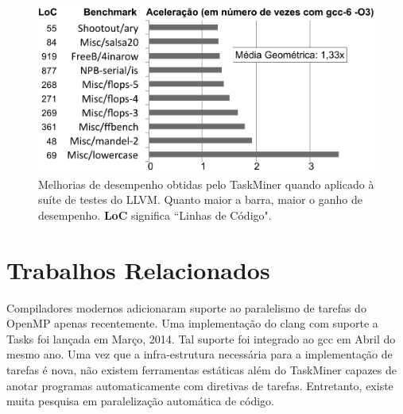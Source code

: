 \documentclass[sigconf]{acmart}
\newcommand\Taskminer{\mbox{\textsf{TaskMiner}}}
\begin{document}
\begin{figure}[t!]
\begin{center}
\includegraphics[width=1\columnwidth]{images/TM_GeneralProgs}
\caption{Melhorias de desempenho obtidas pelo \Taskminer{} quando aplicado à suíte de testes
do LLVM. Quanto maior a barra, maior o ganho de desempenho.
\textbf{LoC} significa ``Linhas de Código".}
\label{fig:TM_GeneralProgs}
\end{center}
\end{figure}



\section{Trabalhos Relacionados}
\label{sec:rw}

Compiladores modernos adicionaram suporte ao paralelismo de tarefas 
do OpenMP apenas recentemente. Uma implementação do \textsf{clang} com suporte a Tasks foi lançada em Março, 2014. Tal suporte foi integrado ao \textsf{gcc} em Abril do mesmo ano.
Uma vez que a infra-estrutura necessária para
a implementação de tarefas é nova, não existem ferramentas estáticas
além do {\Taskminer} capazes de anotar programas
automaticamente com diretivas de tarefas. Entretanto, existe muita pesquisa em paralelização automática de código.
\end{document}
